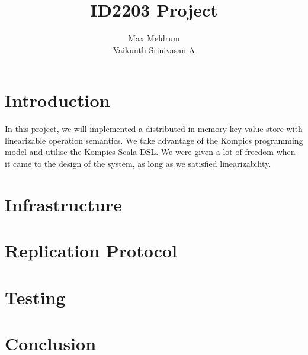 \documentclass[12pt]{article}
\title{\textbf{ID2203 Project}}
\author{Max Meldrum\\
	Vaikunth Srinivasan A}
\date{}
\begin{document}
\maketitle

\section{Introduction}
In this project, we will implemented a distributed in memory key-value store with linearizable operation semantics. We take advantage of the Kompics \cite{DBLP:conf/p2p/AradDH09} programming model and utilise the Kompics Scala DSL. We were given a lot of freedom when it came to the design of the system, as long as we satisfied linearizability.
\section{Infrastructure}

\section{Replication Protocol}

\section{Testing}


\section{Conclusion}



\end{document}
